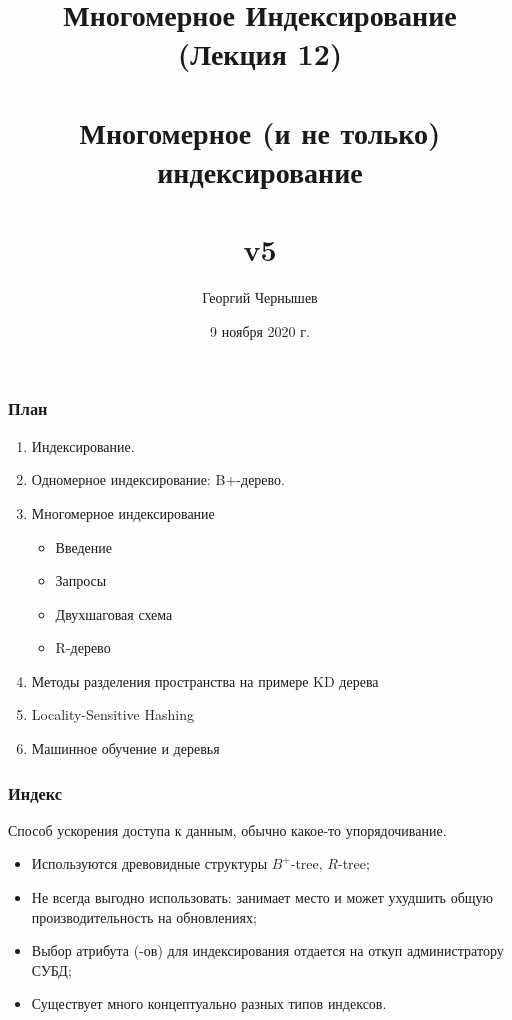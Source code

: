 \documentclass{beamer}
\title[Обработка и исполнение запросов: лекция 12]{Многомерное Индексирование (Лекция 12) \\~\\ Многомерное (и не только) индексирование\\~\\ v5} %
\author{Георгий Чернышев} %
\institute[ВШЭ] %
{
Высшая Школа Экономики \\ %
\medskip
\textit{chernishev@gmail.com} %
}
\date{9 ноября 2020 г.}
\begin{document}
\begin{frame}
\titlepage %
\end{frame}

\begin{frame}
\frametitle{План}

\begin{enumerate}
  \setlength\itemsep{1em}
  \item Индексирование.
  \item Одномерное индексирование: B+-дерево.
  \item Многомерное индексирование
  \begin{itemize}
    \item Введение
    \item Запросы    
    \item Двухшаговая схема
    \item R-дерево
  \end{itemize}
  \item Методы разделения пространства на примере KD дерева
  \item Locality-Sensitive Hashing
  \item Машинное обучение и деревья
\end{enumerate}
\end{frame}

\begin{frame}
\frametitle{Индекс}

Способ ускорения доступа к данным, обычно какое-то упорядочивание.
\begin{itemize}
  \setlength\itemsep{1em}
  \item Используются древовидные структуры $B^{+}$-tree, $R$-tree;
  \item Не всегда выгодно использовать: занимает место и может ухудшить общую производительность на обновлениях; 
  \item Выбор атрибута (-ов) для индексирования отдается на откуп администратору СУБД;
  \item Существует много концептуально разных типов индексов.
\end{itemize}
\end{frame}
\end{document}
